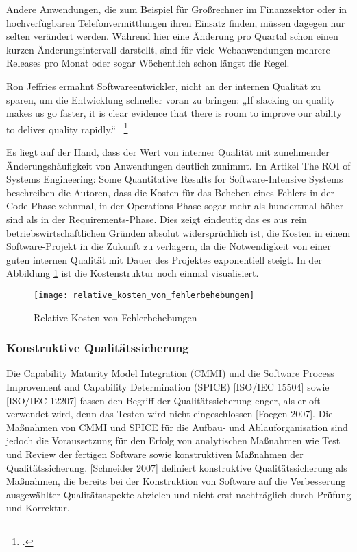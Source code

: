 Andere Anwendungen, die zum Beispiel für Großrechner im Finanzsektor oder in hochverfügbaren Telefonvermittlungen ihren Einsatz finden, müssen dagegen nur selten verändert werden. Während hier eine Änderung pro Quartal schon einen kurzen Änderungsintervall darstellt, sind für viele Webanwendungen mehrere Releases pro Monat oder sogar Wöchentlich schon längst die Regel.

Ron Jeffries ermahnt Softwareentwickler, nicht an der internen Qualität zu sparen, um die Entwicklung schneller voran zu bringen:
„If slacking on quality makes us go faster, it is clear evidence that there is room to improve our ability to deliver quality rapidly.“ ~\footcite[Vgl.]{website:jeffries.2010}

Es liegt auf der Hand, dass der Wert von interner Qualität mit zunehmender Änderungshäufigkeit von Anwendungen deutlich zunimmt. Im Artikel \dq{}The ROI of Systems Engineering: Some Quantitative Results for
Software-Intensive Systems\dq{} beschreiben die Autoren, dass die Kosten für das Beheben eines Fehlers in der Code-Phase zehnmal, in der Operations-Phase sogar mehr als hundertmal höher sind als in der Requirements-Phase. 
Dies zeigt eindeutig das es aus rein betriebswirtschaftlichen Gründen absolut widersprüchlich ist, die Kosten in einem Software-Projekt in die Zukunft zu verlagern, da die Notwendigkeit von einer guten internen Qualität 
mit Dauer des Projektes exponentiell steigt. In der Abbildung \ref{relative_kosten_von_fehlerbehebungen} ist die Kostenstruktur noch einmal visualisiert.

\begin{figure}[H]
    \begin{center}
        \texttt{[image: relative\_kosten\_von\_fehlerbehebungen]}
        \caption{Relative Kosten von Fehlerbehebungen}
        \label{relative_kosten_von_fehlerbehebungen}
    \end{center}
\end{figure}


\subsubsection{Konstruktive Qualitätssicherung} %
Die Capability Maturity Model Integration (CMMI) und die Software Process Improvement and Capability Determination (SPICE) [ISO/IEC 15504] sowie [ISO/IEC 12207] fassen den Begriff der Qualitätssicherung enger, als er oft verwendet wird, denn das Testen wird nicht eingeschlossen [Foegen 2007]. Die Maßnahmen von CMMI und SPICE für die Aufbau- und Ablauforganisation sind jedoch die Voraussetzung für den Erfolg von analytischen Maßnahmen wie Test und Review der fertigen Software sowie konstruktiven Maßnahmen der Qualitätssicherung. [Schneider 2007] definiert konstruktive
Qualitätssicherung als Maßnahmen, die bereits bei der Konstruktion von Software auf die
Verbesserung ausgewählter Qualitätsaspekte abzielen und nicht erst nachträglich durch
Prüfung und Korrektur.


